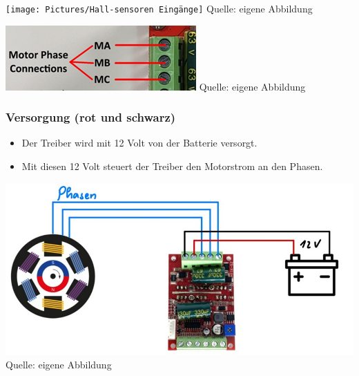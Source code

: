 \documentclass[ngerman,12pt,a4paper]{article}
\begin{document}
			\begin{minipage}{0.48\textwidth} %
				\raggedright
				\texttt{[image: Pictures/Hall-sensoren Eingänge]}
				\label{fig:phasen_motor}
				\vspace{-2pt}
				\small Quelle: eigene Abbildung
			\end{minipage}
			\hfill %
			\begin{minipage}{0.48\textwidth} %
				\raggedright
				\includegraphics[scale=0.5]{Pictures/Phasen-treiber}
				\label{fig:phasen_treiber}
				\vspace{-2pt}
				\small Quelle: eigene Abbildung
			\end{minipage}
			
			\subsubsection*{Versorgung (rot und schwarz)}
			\begin{itemize}
				\item Der Treiber wird mit 12 Volt von der Batterie versorgt.
				\item Mit diesen 12 Volt steuert der Treiber den Motorstrom an den Phasen.
			\end{itemize}
			
			\begin{minipage}{\textwidth}
				\centering
				\includegraphics[scale=0.5]{Pictures/Versorgung-motor}
				\label{fig:spiffs_init}
				\vspace{-2pt}
				\small Quelle: eigene Abbildung
			\end{minipage}
			
\end{document}

